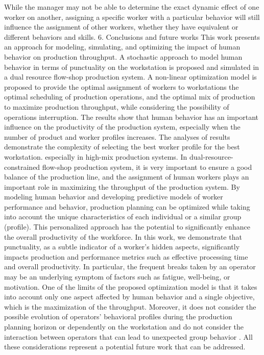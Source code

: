 While the manager may not be able to determine the exact dynamic effect of one worker on another, assigning a specific worker with a particular behavior will still influence the assignment of other workers, whether they have equivalent or different behaviors and skills.
6.	Conclusions and future works
This work presents an approach for modeling, simulating, and optimizing the impact of human behavior on production throughput. A stochastic approach to model human behavior in terms of punctuality on the workstation is proposed and simulated in a dual resource flow-shop production system. A non-linear optimization model is proposed to provide the optimal assignment of workers to workstations the optimal scheduling of production operations, and the optimal mix of production to maximize production throughput, while considering the possibility of operations interruption. The results show that human behavior has an important influence on the productivity of the production system, especially when the number of product and worker profiles increases. The analyses of results demonstrate the complexity of selecting the best worker profile for the best workstation. especially in high-mix production systems. In dual-resource-constrained flow-shop production system, it is very important to ensure a good balance of the production line, and the assignment of human workers plays an important role in maximizing the throughput of the production system.
By modeling human behavior and developing predictive models of worker performance and behavior, production planning can be optimized while taking into account the unique characteristics of each individual or a similar group (profile). This personalized approach has the potential to significantly enhance the overall productivity of the workforce. In this work, we demonstrate that punctuality, as a subtle indicator of a worker’s hidden aspects, significantly impacts production and performance metrics such as effective processing time and overall productivity. In particular, the frequent breaks taken by an operator may be an underlying symptom of factors such as fatigue, well-being, or motivation.
One of the limits of the proposed optimization model is that it takes into account only one aspect affected by human behavior and a single objective, which is the maximization of the throughput. Moreover, it does not consider the possible evolution of operators’ behavioral profiles during the production planning horizon or dependently on the workstation and do not consider the interaction between operators that can lead to unexpected group behavior . All these considerations represent a potential future work that can be addressed.
